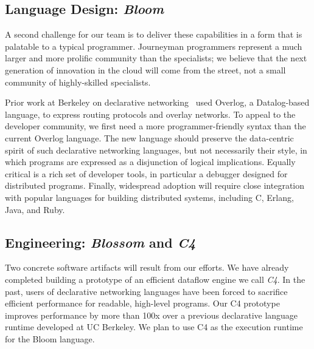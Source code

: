\subsection{Language Design: \emph{Bloom}}
A second challenge for our team is to deliver these capabilities in a form that
is palatable to a typical programmer.  Journeyman programmers represent a much
larger and more prolific community than the specialists; we believe that the
next generation of innovation in the cloud will come from the street, not a
small community of highly-skilled specialists.

Prior work at Berkeley on declarative networking~\cite{loo-sigcomm05, loo-sosp05, loo-sigmod06} 
used Overlog, a Datalog-based language, to express routing protocols and overlay networks.
To appeal to the developer community, we first need a more
programmer-friendly syntax than the current Overlog language. 
The new language should preserve the data-centric spirit of such
declarative networking languages, but not necessarily their style,
in which programs are expressed as a disjunction of logical implications.
Equally
critical is a rich set of developer tools, in particular a debugger
designed for distributed programs.  Finally, widespread adoption will
require close integration with popular languages for building distributed
systems, including C, Erlang, Java, and Ruby.

\subsection{Engineering: \emph{Blossom} and \emph{C4}}
Two concrete software artifacts will result from our efforts. 
We have already completed building a prototype of an efficient dataflow
engine we call \emph{C4}. In the past, users of declarative networking
languages have been forced to sacrifice efficient performance for
readable, high-level programs. 
Our C4 prototype improves performance by more than
100x over a previous declarative language runtime developed at UC
Berkeley. We plan to use C4 as the execution runtime for the Bloom
language. 


